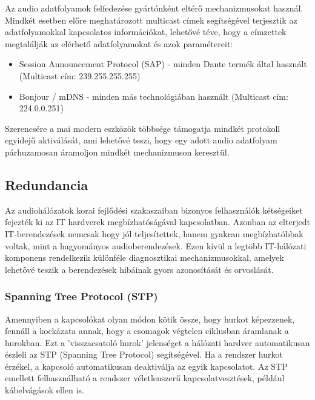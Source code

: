 Az audio adatfolyamok felfedezése gyártónként eltérő mechanizmusokat használ. Mindkét esetben 
előre meghatározott multicast címek segítségével terjesztik az adatfolyamokkal kapcsolatos 
információkat, lehetővé téve, hogy a címzettek megtalálják az elérhető adatfolyamokat és azok paramétereit:

\begin{itemize}
	\item Session Announcement Protocol (SAP) - minden Dante termék által használt (Multicast cím: 239.255.255.255)
\end{itemize}

\begin{itemize}
	\item Bonjour / mDNS - minden más technológiában használt (Multicast cím: 224.0.0.251) 
\end{itemize}
Szerencsére a mai modern eszközök többsége támogatja mindkét protokoll egyidejű aktiválását, 
ami lehetővé teszi, hogy egy adott audio adatfolyam párhuzamosan áramoljon mindkét mechanizmuson keresztül.

\subsection{Redundancia}
Az audiohálózatok korai fejlődési szakaszaiban bizonyos felhasználók kétségeiket 
fejezték ki az IT hardverek megbízhatóságával kapcsolatban. 
Azonban az elterjedt IT-berendezések nemcsak hogy jól teljesítettek, 
hanem gyakran megbízhatóbbak voltak, mint a hagyományos audioberendezések. 
Ezen kívül a legtöbb IT-hálózati komponens rendelkezik különféle diagnosztikai 
mechanizmusokkal, amelyek lehetővé teszik a berendezések hibáinak gyors azonosítását és orvoslását.

\subsubsection{Spanning Tree Protocol (STP)}
Amennyiben a kapcsolókat olyan módon kötik össze, hogy hurkot képezzenek, 
fennáll a kockázata annak, hogy a csomagok végtelen ciklusban áramlanak a hurokban. 
Ezt a 'visszacsatoló hurok' jelenséget a hálózati hardver automatikusan 
észleli az STP (Spanning Tree Protocol) segítségével. Ha a rendszer hurkot 
érzékel, a kapcsoló automatikusan deaktiválja az egyik kapcsolatot. 
Az STP emellett felhasználható a rendszer véletlenszerű kapcsolatvesztések, például kábelvágások ellen is.

